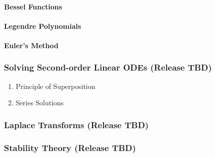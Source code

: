 \paragraph{Bessel Functions}
\paragraph{Legendre Polynomials}
\paragraph{Euler's Method}
\subsubsection{Solving Second-order Linear ODEs \hfill (Release TBD)}
	\begin{enumerate}
		\item Principle of Superposition
		\item Series Solutions
	\end{enumerate}
\subsubsection{Laplace Transforms \hfill (Release TBD)}
\subsubsection{Stability Theory \hfill (Release TBD)}